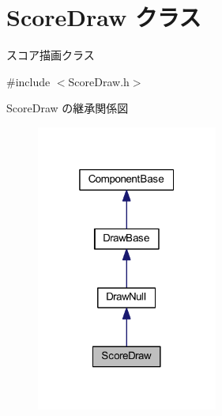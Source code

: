 \hypertarget{class_score_draw}{}\section{Score\+Draw クラス}
\label{class_score_draw}


スコア描画クラス  




{\ttfamily \#include $<$Score\+Draw.\+h$>$}



Score\+Draw の継承関係図\nopagebreak
\begin{figure}[H]
\begin{center}
\leavevmode
\includegraphics[width=169pt]{class_score_draw__inherit__graph}
\end{center}
\end{figure}
